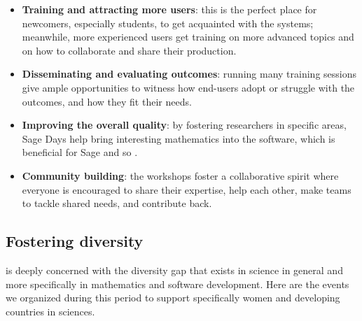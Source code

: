 \documentclass{deliverablereport}
\begin{document}
\begin{itemize}
\item \textbf{Training and attracting more users}: this is the perfect
  place for newcomers, especially students, to get acquainted with the
  systems; meanwhile, more experienced users get training on more
  advanced topics and on how to collaborate and share their
  production.

\item \textbf{Disseminating and evaluating \ODK outcomes}: running
  many training sessions give ample opportunities to witness how
  end-users adopt or struggle with the \ODK outcomes, and how they fit
  their needs.

\item \textbf{Improving the overall quality}: by fostering researchers
  in specific areas, Sage Days help bring interesting mathematics into
  the software, which is beneficial for Sage and so \ODK.

\item \textbf{Community building}: the workshops foster a
  collaborative spirit where everyone is encouraged to share their
  expertise, help each other, make teams to tackle shared needs, and
  contribute back.
\end{itemize}





















\subsection{Fostering diversity}

\ODK is deeply concerned with the diversity gap that exists in science
in general and more specifically in mathematics and software
development. Here are the events we organized during this period to
support specifically women and developing countries in sciences.
\end{document}
